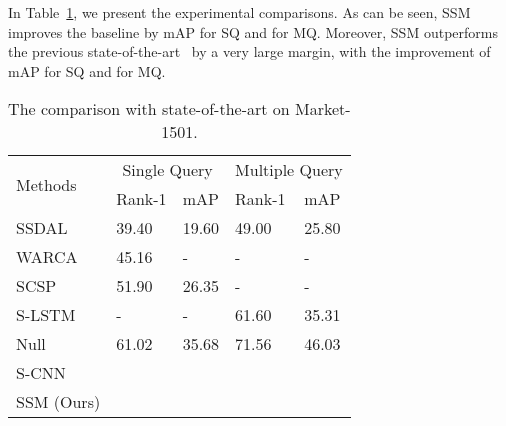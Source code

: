 \documentclass[10pt,twocolumn,letterpaper]{article}
\begin{document}
In Table~\ref{table:market1501_art}, we present the experimental comparisons. As can be seen, SSM improves the baseline by mAP  for SQ and  for MQ. Moreover, SSM outperforms the previous state-of-the-art~\cite{S-CNN} by a very large margin, with the improvement of mAP  for SQ and  for MQ.
\begin{table}[tb]
\small
\centering
\begin{tabular}{|l|*{2}{p{1.1cm}<{\centering}}|*{2}{p{1.1cm}<{\centering}}|}
\hline
\multirow{2}{*}{Methods}   & \multicolumn{2}{c|}{Single Query} & \multicolumn{2}{c|}{Multiple Query}\\
\cline{2-5}
          & Rank-1 & mAP & Rank-1 & mAP   \\
\hline
\hline
SSDAL~\cite{SuChi2} & 39.40 & 19.60 & 49.00 & 25.80  \\
WARCA~\cite{WARCA} & 45.16 & - & - & - \\
SCSP~\cite{SCSP} & 51.90 & 26.35 & - & - \\
S-LSTM~\cite{S-LSTM} & - & - & 61.60 & 35.31 \\
Null~\cite{null} & 61.02 & 35.68 & 71.56 & 46.03 \\
S-CNN~\cite{S-CNN} & \textbf{\color{blue}{65.88}} & \textbf{\color{blue}{39.55}} & \textbf{\color{blue}{76.04}} & \textbf{\color{blue}{48.45}} \\
\hline
\hline
SSM (Ours) & \textbf{\color{red}{82.21}} & \textbf{\color{red}{68.80}} & \textbf{\color{red}{88.18}} & \textbf{\color{red}{76.18}} \\
\hline
\end{tabular}
\caption{The comparison with state-of-the-art on Market-1501.}
\label{table:market1501_art}
\vspace{-1ex}
\end{table}
\end{document}
